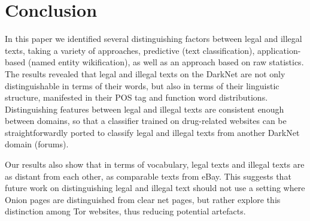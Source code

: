 \documentclass[11pt,a4paper,table]{article}
\begin{document}
\section{Conclusion} \label{sec:conclusion}

  In this paper we identified several distinguishing factors between legal and illegal texts, taking
  a variety of approaches, predictive (text classification), application-based (named entity wikification),
  as well as an approach based on raw statistics. The results revealed that legal and illegal texts on the DarkNet
  are not only distinguishable in terms of their words, but also in terms of their linguistic structure, manifested
  in their POS tag and function word distributions. Distinguishing features between legal and illegal texts are
  consistent enough between domains, so that a classifier trained on drug-related websites can be straightforwardly
  ported to classify legal and illegal texts from another DarkNet domain (forums).

  Our results also show that in terms of vocabulary, legal texts and illegal texts are as distant from each other, as 
  comparable texts from eBay.
  This suggests that future work on distinguishing legal and illegal text should not use a setting where Onion pages
    are distinguished from clear net pages, but rather explore this distinction among Tor websites, 
    thus reducing potential artefacts.




\end{document}
